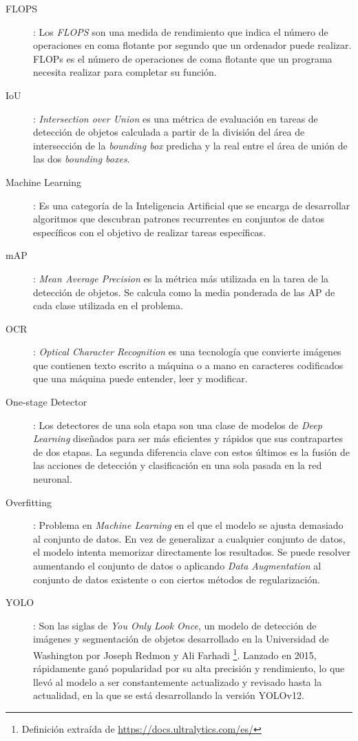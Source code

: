 \documentclass[12pt,a4paper,onecolumn,oneside]{report}
\begin{document}
\begin{description}
\item[FLOPS]: Los \textit{FLOPS} son una medida de rendimiento que indica el número de operaciones en coma flotante por segundo que un ordenador puede realizar. FLOPs es el número de operaciones de coma flotante que un programa necesita realizar para completar su función.

\item[IoU]: \textit{Intersection over Union} es una métrica de evaluación en tareas de detección de objetos calculada a partir de la división del área de intersección de la \textit{bounding box} predicha y la real entre el área de unión de las dos \textit{bounding boxes}.

\item[Machine Learning]: Es una categoría de la Inteligencia Artificial que se encarga de desarrollar algoritmos que descubran patrones recurrentes en conjuntos de datos específicos con el objetivo de realizar tareas específicas.

\item[mAP]: \textit{Mean Average Precision} es la métrica más utilizada en la tarea de la detección de objetos. Se calcula como la media ponderada de las AP de cada clase utilizada en el problema.

\item[OCR]: \textit{Optical Character Recognition} es una tecnología que convierte imágenes que contienen texto escrito a máquina o a mano en caracteres codificados que una máquina puede entender, leer y modificar.

\item[One-stage Detector]: Los detectores de una sola etapa son una clase de modelos de \textit{Deep Learning} diseñados para ser más eficientes y rápidos que sus contrapartes de dos etapas. La segunda diferencia clave con estos últimos es la fusión de las acciones de detección y clasificación en una sola pasada en la red neuronal.

\item[Overfitting]: Problema en \textit{Machine Learning} en el que el modelo se ajusta demasiado al conjunto de datos. En vez de generalizar a cualquier conjunto de datos, el modelo intenta memorizar directamente los resultados. Se puede resolver aumentando el conjunto de datos o aplicando \textit{Data Augmentation} al conjunto de datos existente o con ciertos métodos de regularización.
	
\item[YOLO]: Son las siglas de \textit{You Only Look Once}, un modelo de detección de imágenes y segmentación de objetos desarrollado en la Universidad de Washington por Joseph Redmon y Ali Farhadi \footnote{Definición extraída de \url{https://docs.ultralytics.com/es/}}. Lanzado en 2015, rápidamente ganó popularidad por su alta precisión y rendimiento, lo que llevó al modelo a ser constantemente actualizado y revisado hasta la actualidad, en la que se está desarrollando la versión YOLOv12.

\end{description}
\end{document}
